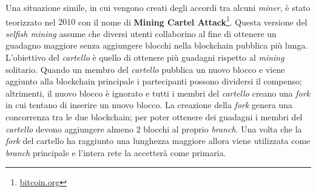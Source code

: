 Una situazione simile, in cui vengono creati degli accordi tra alcuni \textit{miner}, è stato teorizzato nel $2010$ con il nome di \textbf{Mining Cartel Attack}\footnote{\href{https://web.archive.org/web/20101222041256/http://www.bitcoin.org/smf/index.php?topic=2227.0}{bitcoin.org}}. Questa versione del \textit{selfish mining} assume che diversi utenti collaborino al fine di ottenere un guadagno maggiore senza aggiungere blocchi nella blockchain pubblica più lunga. L'obiettivo del \textit{cartello} è quello di ottenere più guadagni rispetto al \textit{mining} solitario. Quando un membro del \textit{cartello} pubblica un nuovo blocco e viene aggiunto alla blockchain principale i partecipanti possono dividersi il compenso; altrimenti, il nuovo blocco è ignorato e tutti i membri del \textit{cartello} creano una \textit{fork} in cui tentano di inserire un nuovo blocco. La creazione della \textit{fork} genera una concorrenza tra le due blockchain; per poter ottenere dei guadagni i membri del \textit{cartello} devono aggiungere almeno $2$ blocchi al proprio \textit{branch}. Una volta che la \textit{fork} del cartello ha raggiunto una lunghezza maggiore allora viene utilizzata come \textit{branch} principale e l'intera rete la accetterà come primaria.


